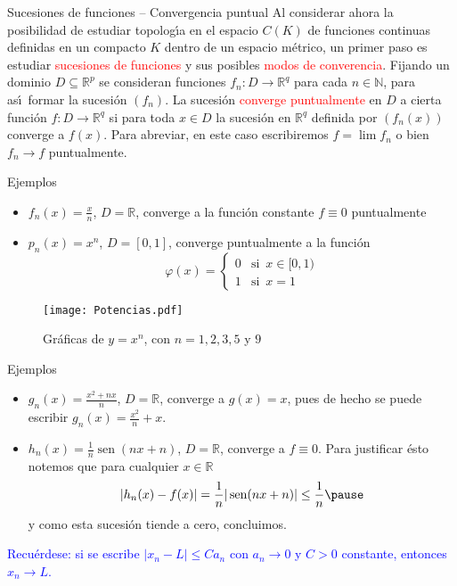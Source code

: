 \documentclass[xcolor=dvipsnames,10pt,handout, draft]{beamer}
\DeclareMathOperator{\sen}{sen}
\newcommand{\rz}{\mathbb R}
\newcommand{\rzq}{\mathbb R^{q}}
\begin{document}



\begin{frame}{Sucesiones de funciones -- Convergencia puntual}
Al considerar ahora la posibilidad de estudiar topolog\'\i a en el espacio $C(K)$ de funciones continuas definidas en un compacto $K$ dentro de un espacio m\'etrico, un primer paso es estudiar \textcolor{red}{sucesiones de funciones} y sus posibles \textcolor{red}{modos de converencia}.
\pause\vskip2pt
Fijando un dominio $D\subseteq\mathbb R^p$ se consideran funciones $f_n:D\to\mathbb R^q$ para cada $n\in\mathbb N$, para as\'\i\ formar la sucesi\'on $(f_n)$.
\pause\vskip2pt
La sucesi\'on \textcolor{red}{converge puntualmente} en $D$ a cierta funci\'on $f:D\to\mathbb R^q$ si para toda $x\in D$ la sucesi\'on en $\rzq$ definida por $(f_n(x))$ converge a $f(x)$.
\pause\vskip2pt
Para abreviar, en este caso escribiremos $f=\lim f_n$ o bien $f_n\to f$ puntualmente. 
\end{frame}

\begin{frame}{Ejemplos}
\begin{itemize}
\item $\displaystyle f_n(x)=\frac{x}{n}$, $D=\rz$, converge a la funci\'on constante $f\equiv0$ puntualmente\pause
\item $p_n(x)=x^n$, $D=[0,1]$, converge puntualmente a la funci\'on
$$\varphi(x)=\left\{\begin{array}{ll}
				0&\text{si }\,x\in[0,1)\\
				1&\text{si }\,x=1
			\end{array}\right.$$
\end{itemize}
\begin{figure}
\texttt{[image: Potencias.pdf]}
\caption{Gr\'aficas de $y=x^n$, con $n=1,2, 3, 5$  y $9$}
\end{figure}
\end{frame}

\begin{frame}{Ejemplos}
\begin{itemize}
\item $\displaystyle g_n(x)=\frac{x^2+nx}{n}$, $D=\rz$, converge a $g(x)=x$, pues de hecho se puede escribir $\displaystyle g_n(x)=\frac{x^2}{n}+x$.\pause
\item $\displaystyle h_n(x)=\frac{1}{n}\sen(nx+n)$, $D=\rz$, converge a $f\equiv0$. \pause Para justificar \'esto notemos que para cualquier $x\in\rz$
$$|h_n(x)-f(x)|=\frac{1}{n}|\sen(nx+n)|\leq\frac{1}{n}\pause$$
y como esta sucesi\'on tiende a cero, concluimos.\pause
\end{itemize}
\vskip6pt
\textcolor{blue}{Recu\'erdese: si se escribe $|x_n-L|\leq Ca_n$ con $a_n\to0$ y $C>0$ constante, entonces $x_n\to L$.}
\end{frame}
\end{document}
